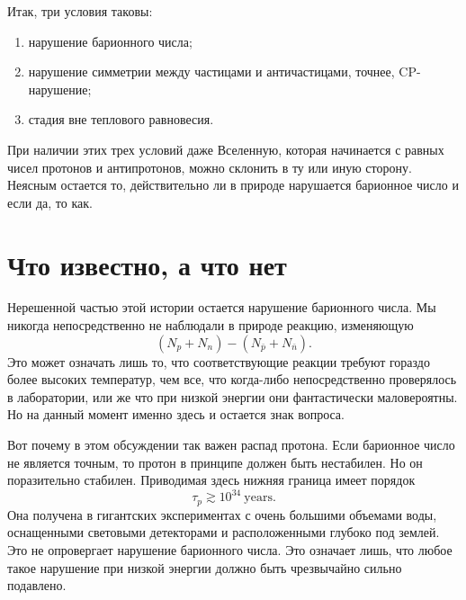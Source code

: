 Итак, три условия таковы:
\begin{enumerate}
\item нарушение барионного числа;
\item нарушение симметрии между частицами и античастицами, точнее, CP-нарушение;
\item стадия вне теплового равновесия.
\end{enumerate}

\begin{classroomqa}
\end{classroomqa}

При наличии этих трех условий даже Вселенную, которая начинается с равных чисел протонов и антипротонов, можно склонить в ту или иную сторону. Неясным остается то, действительно ли в природе нарушается барионное число и если да, то как.

\section{Что известно, а что нет}

Нерешенной частью этой истории остается нарушение барионного числа. Мы никогда непосредственно не наблюдали в природе реакцию, изменяющую
\[
(N_p+N_n)-(N_{\bar p}+N_{\bar n}).
\]
Это может означать лишь то, что соответствующие реакции требуют гораздо более высоких температур, чем все, что когда-либо непосредственно проверялось в лаборатории, или же что при низкой энергии они фантастически маловероятны. Но на данный момент именно здесь и остается знак вопроса.

Вот почему в этом обсуждении так важен распад протона. Если барионное число не является точным, то протон в принципе должен быть нестабилен. Но он поразительно стабилен. Приводимая здесь нижняя граница имеет порядок
\[
\tau_p \gtrsim 10^{34}\ \text{years}.
\]
Она получена в гигантских экспериментах с очень большими объемами воды, оснащенными световыми детекторами и расположенными глубоко под землей. Это не опровергает нарушение барионного числа. Это означает лишь, что любое такое нарушение при низкой энергии должно быть чрезвычайно сильно подавлено.

